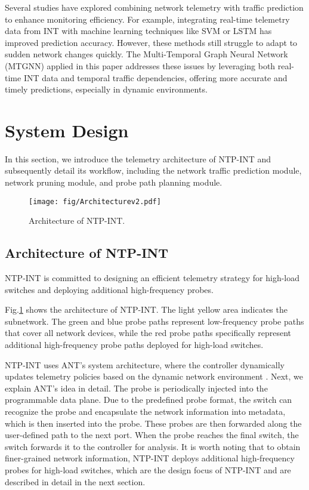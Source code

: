 \documentclass[journal]{IEEEtran}
\begin{document}
Several studies have explored combining network telemetry with traffic prediction to enhance monitoring efficiency. For example, integrating real-time telemetry data from INT with machine learning techniques like SVM or LSTM has improved prediction accuracy. However, these methods still struggle to adapt to sudden network changes quickly. The Multi-Temporal Graph Neural Network (MTGNN) applied in this paper addresses these issues by leveraging both real-time INT data and temporal traffic dependencies, offering more accurate and timely predictions, especially in dynamic environments.



\section{System Design}
\label{section3}
In this section, we introduce the telemetry architecture of NTP-INT and subsequently detail its workflow, including the network traffic prediction module, network pruning module, and probe path planning module.

\begin{figure}
\centering
\setlength{\abovecaptionskip}{0.cm}

\texttt{[image: fig/Architecturev2.pdf]}
\caption{Architecture of NTP-INT. }
\label{fig1}
\end{figure}
\subsection{Architecture of NTP-INT}
NTP-INT is committed to designing an efficient telemetry strategy for high-load switches and deploying additional high-frequency probes.

Fig.\ref{fig1} shows the architecture of NTP-INT. The light yellow area indicates the subnetwork. The green and blue probe paths represent low-frequency probe paths that cover all network devices, while the red probe paths specifically represent additional high-frequency probe paths deployed for high-load switches.

NTP-INT uses ANT's system architecture, where the controller dynamically updates telemetry policies based on the dynamic network environment \cite{12}. Next, we explain ANT's idea in detail. The probe is periodically injected into the programmable data plane. Due to the predefined probe format, the switch can recognize the probe and encapsulate the network information into metadata, which is then inserted into the probe. These probes are then forwarded along the user-defined path to the next port. When the probe reaches the final switch, the switch forwards it to the controller for analysis.
It is worth noting that to obtain finer-grained network information, NTP-INT deploys additional high-frequency probes for high-load switches, which are the design focus of NTP-INT and are described in detail in the next section.
\end{document}
